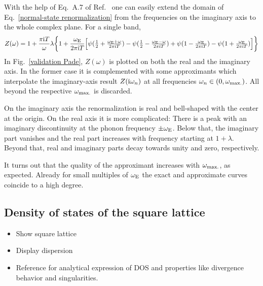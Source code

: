 With the help of Eq.~A.7 of Ref.~ one can easily
extend the domain of Eq.~\ref{normal-state renormalization} from the
 frequencies on the imaginary axis to the whole complex plane.
For a single band,
%
\begin{equation*}
    Z(\omega) = 1 + \frac {\pi \mathrm i T} \omega \lambda \bigg \{
        1 + \frac{\omega \sb{\text{E}}}{2 \pi \mathrm i T} \Big[
              \psi(\tfrac 1 2 + \tfrac{\omega \sb{\text{E}} + \omega}{2 \pi \mathrm i T})
            - \psi(\tfrac 1 2 - \tfrac{\omega \sb{\text{E}} - \omega}{2 \pi \mathrm i T})
            + \psi(1 - \tfrac{\omega \sb{\text{E}}}{2 \pi \mathrm i T})
            - \psi(1 + \tfrac{\omega \sb{\text{E}}}{2 \pi \mathrm i T})
        \Big]
    \bigg \}
\end{equation*}
%
In Fig.~\ref{validation Pade}, $Z(\omega)$ is plotted on both the real and the
imaginary axis. In the former case it is complemented with some 
approximants which interpolate the imaginary-axis result $Z(\mathrm i \omega_n)$ at all
 frequencies $\omega_n \in (0, \omega \sb{\text{max.}})$. All beyond
the respective $\omega \sb{\text{max.}}$ is discarded.

On the imaginary axis the renormalization is real and bell-shaped with the
center at the origin. On the real axis it is more complicated: There is a peak
with an imaginary discontinuity at the phonon frequency $\pm \omega \sb{\text{E}}$.
Below that, the imaginary part vanishes and the real part increases with
frequency starting at $1 + \lambda$. Beyond that, real and imaginary parts decay
towards unity and zero, respectively.

It turns out that the quality of the  approximant increases with
$\omega \sb{\text{max.}}$, as expected. Already for small multiples of $\omega \sb{\text{E}}$
the exact and approximate curves coincide to a high degree.

\subsection{Density of states of the square lattice}

\begin{itemize}
    \item Show square lattice
    \item Display dispersion
    \item Reference  for analytical expression of DOS and
          properties like divergence behavior and  singularities.
\end{itemize}

